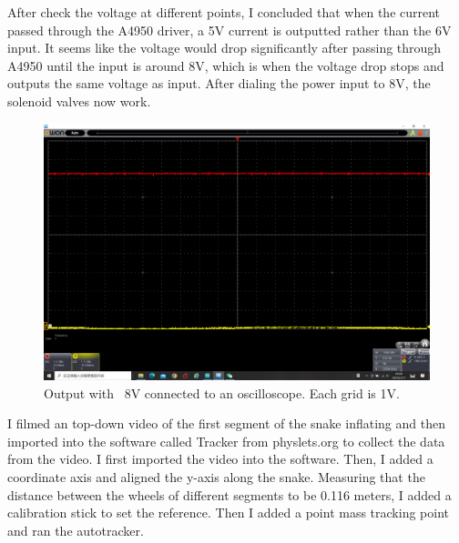 \documentclass[twoside]{article}
\begin{document}
After check the voltage at different points, I concluded that when the current passed through the A4950 driver, a 5V current is outputted rather than the 6V input. It seems like the voltage would drop significantly after passing through A4950 until the input is around 8V, which is when the voltage drop stops and outputs the same voltage as input. After dialing the power input to 8V, the solenoid valves now work.

\begin{figure} [H]
\centering
\includegraphics[width=\textwidth]{Oscilloscope}
\caption{Output with ~8V connected to an oscilloscope. Each grid is 1V.}
\end{figure} 

I filmed an top-down video of the first segment of the snake inflating and then imported into the software called Tracker from physlets.org to collect the data from the video. I first imported the video into the software. Then, I added a coordinate axis and aligned the y-axis along the snake. Measuring that the distance between the wheels of different segments to be 0.116 meters, I added a calibration stick to set the reference. Then I added a point mass tracking point and ran the autotracker. 
\end{document}
